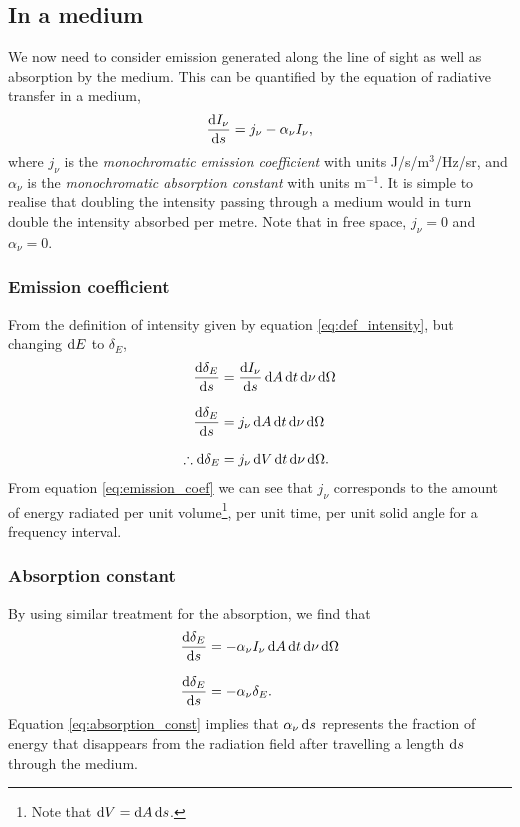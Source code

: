 \subsection{In a medium}
We now need  to consider emission generated along the line of sight as well as absorption by the medium.
 This can be quantified by the equation of radiative transfer in a medium,
%
\begin{equation}
	\frac{\mathop{}\!\mathrm{d} I_\nu}{\mathop{}\!\mathrm{d} s} = j_\nu - \alpha_\nu I_\nu,
	\label{eq:radiative_transfer}
\end{equation}
%
where $j_\nu$ is the \emph{monochromatic emission coefficient} with units J/s/m$^3$/Hz/sr, and $\alpha_\nu$ is the \emph{monochromatic absorption constant} with units m$^{-1}$.
 It is simple to realise that doubling the intensity passing through a medium would in turn double the intensity absorbed per metre.
 Note that in free space, $j_\nu = 0$ and $\alpha_\nu = 0$.
\par
\subsubsection{Emission coefficient}
From the definition of intensity given by equation \ref{eq:def_intensity}, but changing $\mathop{}\!\mathrm{d} E$ to $\delta_E$,
%
\begin{align}
	\frac{\diff \delta_E}{\diff s} &= \frac{\diff I_\nu}{\diff s} \diff A \diff t \diff \nu \diff \Omega
	\linedrop
	\frac{\diff \delta_E}{\diff s} &= j_\nu \diff A \diff t \diff \nu \diff \Omega
	\linedrop
	\therefore \diff \delta_E &= j_\nu \diff V \diff t \diff \nu \diff \Omega.
	\label{eq:emission_coef}
\end{align}
%
From equation \ref{eq:emission_coef} we can see that $j_\nu$ corresponds to the amount of energy radiated per unit volume\footnote{Note that $\mathop{}\!\mathrm{d} V = \mathop{}\!\mathrm{d} A \mathop{}\!\mathrm{d} s$.}, per unit time, per unit solid angle for a frequency interval.
\par 
\subsubsection{Absorption constant}
By using similar treatment for the absorption, we find that
%
\begin{align}
		\frac{\diff \delta_E}{\diff s} &= -\alpha_\nu I_\nu  \diff A \diff t \diff \nu \diff \Omega
		\linedrop
		\frac{\diff \delta_E}{\diff s} &= -\alpha_\nu \delta_E.
		\label{eq:absorption_const}
\end{align}
%
Equation \ref{eq:absorption_const} implies that $\alpha_\nu \mathop{}\!\mathrm{d} s$ represents the fraction of energy that disappears from the radiation field after travelling a length $\mathop{}\!\mathrm{d} s$ through the medium.
\par  

